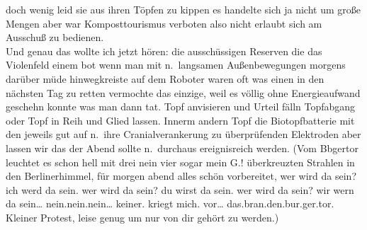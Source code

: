 \documentclass[
]{article}
\begin{document}
doch wenig leid sie aus ihren Töpfen zu kippen es handelte sich ja nicht
um große Mengen aber war Komposttourismus verboten also nicht erlaubt
sich am Ausschuß zu bedienen.\\
Und genau das wollte ich jetzt hören: die ausschüssigen Reserven die das
Violenfeld einem bot wenn man mit n.~langsamen Außenbewegungen morgens
darüber müde hinwegkreiste auf dem Roboter waren oft was einen in den
nächsten Tag zu retten vermochte das einzige, weil es völlig ohne
Energieaufwand geschehn konnte was man dann tat. Topf anvisieren und
Urteil fälln Topfabgang oder Topf in Reih und Glied lassen. Innerm
andern Topf die Biotopfbatterie mit den jeweils gut auf n.~ihre
Cranialverankerung zu überprüfenden Elektroden aber lassen wir das der
Abend sollte n.~durchaus ereignisreich werden. (Vom Bbgertor leuchtet es
schon hell mit drei nein vier sogar mein G.! überkreuzten Strahlen in
den Berlinerhimmel, für morgen abend alles schön vorbereitet, wer wird
da sein? ich werd da sein. wer wird da sein? du wirst da sein. wer wird
da sein? wir wern da sein\ldots{} nein.nein.nein\ldots{} keiner. kriegt
mich. vor\ldots{} das.bran.den.bur.ger.tor. Kleiner Protest, leise genug
um nur von dir gehört zu werden.)
\end{document}
